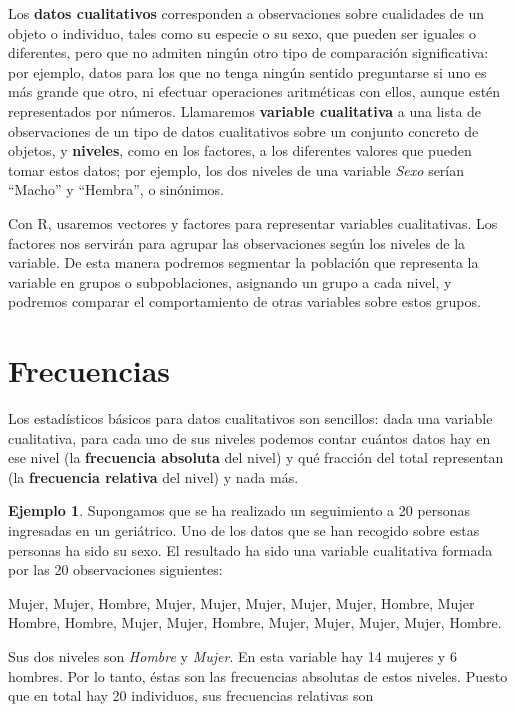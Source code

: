 \documentclass[
]{book}
\theoremstyle{definition}
\theoremstyle{definition}
\newtheorem{example}{Ejemplo}[chapter]
\theoremstyle{definition}
\theoremstyle{remark}
\begin{document}
Los \textbf{datos cualitativos} corresponden a observaciones sobre cualidades de un objeto o individuo, tales como su especie o su sexo, que pueden ser iguales o diferentes, pero que no admiten ningún otro tipo de comparación significativa: por ejemplo, datos para los que no tenga ningún sentido preguntarse si uno es más grande que otro, ni efectuar operaciones aritméticas con ellos, aunque estén representados por números. Llamaremos \textbf{variable cualitativa} a una lista de observaciones de un tipo de datos cualitativos sobre un conjunto concreto de objetos, y \textbf{niveles}, como en los factores, a los diferentes valores que pueden tomar estos datos; por ejemplo, los dos niveles de una variable \emph{Sexo} serían ``Macho'' y ``Hembra'', o sinónimos.

Con R, usaremos vectores y factores para representar variables cualitativas. Los factores nos servirán para agrupar las observaciones según los niveles de la variable. De esta manera podremos segmentar la población que representa la variable en grupos o subpoblaciones, asignando un grupo a cada nivel, y podremos comparar el comportamiento de otras variables sobre estos grupos.

\hypertarget{sec:edqual}{%
\section{Frecuencias}\label{sec:edqual}}

Los estadísticos básicos para datos cualitativos son sencillos: dada una variable
cualitativa, para cada uno de sus niveles podemos contar cuántos datos hay en ese nivel (la \textbf{frecuencia absoluta} del nivel) y qué fracción del total representan (la \textbf{frecuencia relativa} del nivel) y nada más.

\begin{example}
\protect\hypertarget{exm:ex1601}{}{\label{exm:ex1601} }Supongamos que se ha realizado un seguimiento a 20 personas ingresadas en un geriátrico. Uno de los datos que se han recogido sobre estas personas ha sido su sexo. El resultado ha sido una variable cualitativa formada por las 20 observaciones siguientes:
\end{example}

Mujer, Mujer, Hombre, Mujer, Mujer, Mujer, Mujer, Mujer, Hombre, Mujer
Hombre, Hombre, Mujer, Mujer, Hombre, Mujer, Mujer, Mujer, Mujer, Hombre.

Sus dos niveles son \emph{Hombre} y \emph{Mujer}. En esta variable
hay 14 mujeres y 6 hombres. Por lo tanto, éstas son las frecuencias absolutas de estos niveles. Puesto que en total hay 20 individuos, sus frecuencias relativas son
\end{document}
